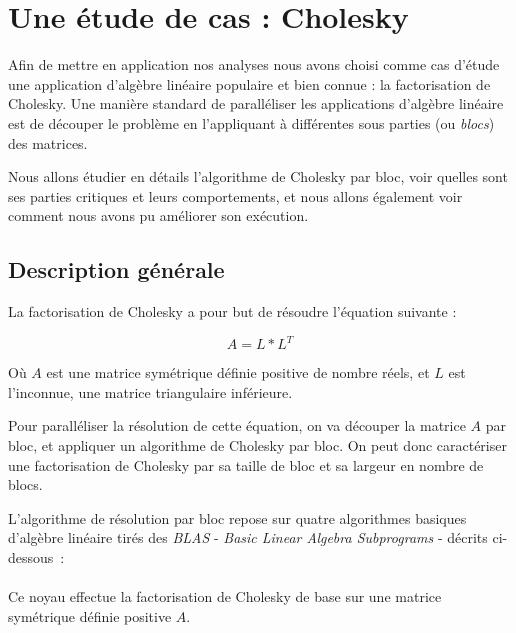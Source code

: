 \section{Une étude de cas : Cholesky}\label{sec:contribs:apps:cholesky}

Afin de mettre en application nos analyses nous avons choisi comme cas d'étude une application d'algèbre linéaire populaire et bien connue : la factorisation de Cholesky.
Une manière standard de paralléliser les applications d'algèbre linéaire est de découper le problème en l'appliquant à différentes sous parties (ou \emph{blocs}) des matrices.

Nous allons étudier en détails l'algorithme de Cholesky par bloc, voir quelles sont ses parties critiques et leurs comportements, et nous allons également voir comment nous avons pu améliorer son exécution.


\subsection{Description générale}

La factorisation de Cholesky a pour but de résoudre l'équation suivante :

$$ A = L*L^T$$

Où $A$ est une matrice symétrique définie positive de nombre réels, et $L$ est l'inconnue, une matrice triangulaire inférieure.

Pour paralléliser la résolution de cette équation, on va découper la matrice $A$ par bloc, et appliquer un algorithme de Cholesky par bloc.
On peut donc caractériser une factorisation de Cholesky par sa taille de bloc et sa largeur en nombre de blocs.

L'algorithme de résolution par bloc repose sur quatre algorithmes basiques d'algèbre linéaire tirés des \emph{BLAS} - \emph{Basic Linear Algebra Subprograms} - décrits ci-dessous~:


\paragraph{}

Ce noyau effectue la factorisation de Cholesky de base sur une matrice symétrique définie positive $A$.

\paragraph{}

